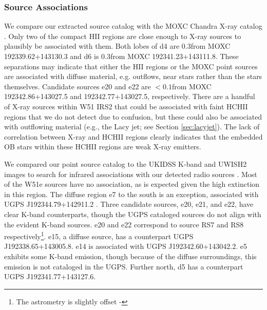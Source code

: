 

\subsubsection{Source Associations}
\label{sec:associations}
We compare our extracted source catalog with the MOXC Chandra X-ray catalog
\citep{Townsley2014a}.  Only two of the compact HII regions are close enough to
X-ray sources to plausibly be associated with them.  Both lobes of d4 are
0.3\arcsec from MOXC 192339.62+143130.3 and d6 is 0.3\arcsec from MOXC
192341.23+143111.8.    These
separations may indicate that either the HII regions or the MOXC point sources
are associated with diffuse material, e.g. outflows,
near stars rather than the stars themselves.  
Candidate sources e20 and e22 are $<0.1$\arcsec from
MOXC 192342.86+143027.5 and 192342.77+143027.5, respectively.
There are a handful of X-ray
sources within W51 IRS2 that could be associated with faint HCHII regions that
we do not detect due to confusion, but these could also be associated with
outflowing material (e.g., the Lacy jet; see Section \ref{sec:lacyjet}).  The
lack of correlation between X-ray and HCHII regions clearly indicates that the
embedded OB stars within these HCHII regions are weak X-ray emitters.  

We compared our point source catalog to the UKIDSS K-band and UWISH2 \hh images to
search for infrared associations with our detected radio sources
\citep{Lucas2008a,Froebrich2011a}.  Most of the W51e sources have no
association, as is expected given the high extinction in this region.  The
diffuse region e7 to the south is an exception, associated with UGPS
J192344.79+142911.2 \citep{Lucas2008a}.  Three candidate sources, e20, e21, and
e22, have clear K-band counterparts, though the UGPS cataloged sources do not align
with the evident K-band sources.  e20 and e22 correspond to \citet{Goldader1994a}
source RS7 and RS8 respectively\footnote{The \citet{Goldader1994a} astrometry
is slightly offset - }.  e15, a diffuse source, has a counterpart UGPS
J192338.65+143005.8.  e14 is associated with UGPS J192342.60+143042.2.  e5
exhibits some K-band emission, though because of the diffuse surroundings,
this emission is not cataloged in the UGPS.
Further north, d5 has a counterpart UGPS J192341.77+143127.6.



